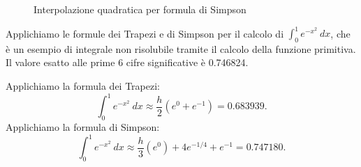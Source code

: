\documentclass{article}
\begin{document}
\begin{figure}[!ht]
   \centering 
   \caption{Interpolazione quadratica per formula di Simpson}
\end{figure}

\begin{example}
    Applichiamo le formule dei Trapezi e di Simpson per il calcolo di
    $\int_{0}^{1}e^{-x^2}\ dx$, che è un esempio di integrale non risolubile
    tramite il calcolo della funzione primitiva. Il valore esatto alle prime 6
    cifre significative è 0.746824.

    Applichiamo la formula dei Trapezi:
    $$\displaystyle\int_{0}^{1}e^{-x^2}\ dx\approx
    \frac{h}{2}(e^0+e^{-1})=0.683939.$$
    Applichiamo la formula di Simpson:
    $$\displaystyle\int_{0}^{1}e^{-x^2}\ dx\approx
    \frac{h}{3}(e^0)+4e^{-1/4}+e^{-1}=0.747180.$$
\end{example}
\end{document}
